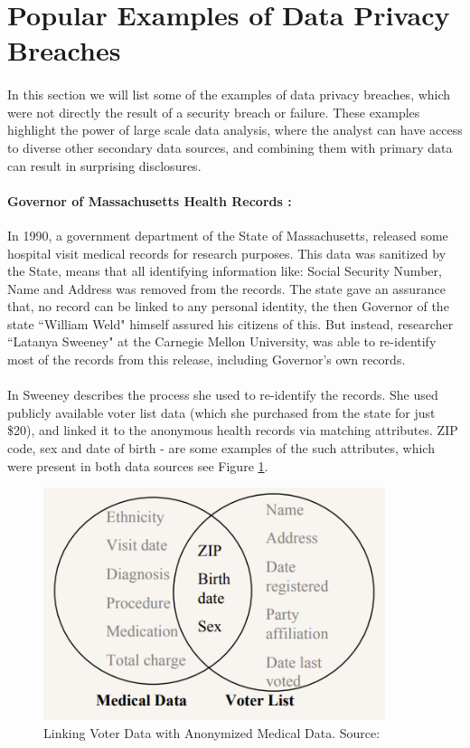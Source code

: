 \documentclass[12pt]{report}
\theoremstyle{named}
\begin{document}
\section{Popular Examples of Data Privacy Breaches}
\paragraph{}
 In this section we will list some of the examples of data privacy breaches, which were not directly the result of a security breach or failure. These examples highlight the power of large scale data analysis, where the analyst can have access to diverse other secondary data sources, and combining them with primary data can result in surprising disclosures.
\paragraph{Governor of Massachusetts Health Records \cite{sweeney2000uniqueness}:\\}
In 1990, a government department of the State of Massachusetts, released some hospital visit medical records for research purposes. This data was sanitized by the State, means that all identifying information like: Social Security Number, Name and Address was removed from the records. The state gave an assurance that, no record can be linked to any personal identity, the then Governor of the state ``William Weld" himself assured his citizens of this. But instead, researcher ``Latanya Sweeney" at the Carnegie Mellon University, was able to re-identify most of the records from this release, including Governor's own records. 
\paragraph{}
In \cite{sweeney2000uniqueness} Sweeney describes the process she used to re-identify the records. She used publicly available voter list data (which she purchased from the state for just \$20), and linked it to the anonymous health records via matching attributes. ZIP code, sex and  date of birth - are some examples of the such attributes, which were present in both data sources see Figure \ref{fig:voterMedical}.

\begin{figure}[ht]
\centering
        \includegraphics[width=100mm,scale=0.5]{Images/GovMassReId.PNG}
    \caption{Linking Voter Data with Anonymized Medical Data. Source:\cite{sweeney2000uniqueness}}
    \label{fig:voterMedical}
\end{figure}
\end{document}
